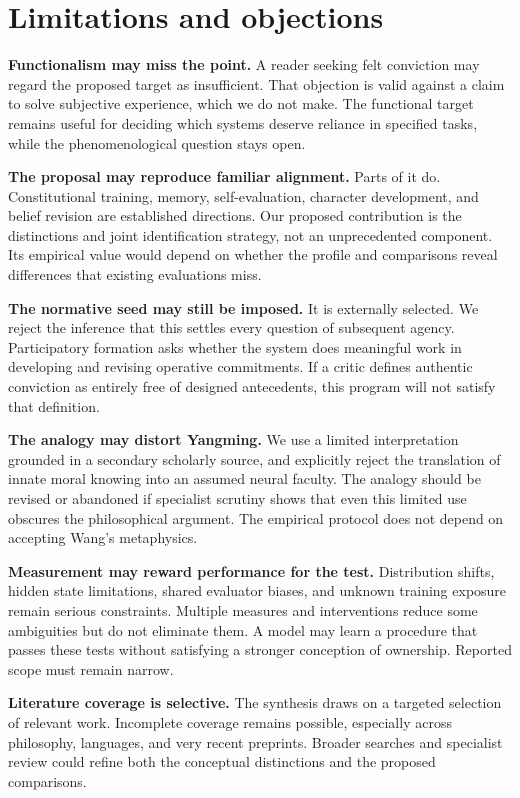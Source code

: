 \documentclass[11pt]{article}
\begin{document}
\section{Limitations and objections}

\textbf{Functionalism may miss the point.} A reader seeking felt conviction may regard the proposed target as insufficient. That objection is valid against a claim to solve subjective experience, which we do not make. The functional target remains useful for deciding which systems deserve reliance in specified tasks, while the phenomenological question stays open.

\textbf{The proposal may reproduce familiar alignment.} Parts of it do. Constitutional training, memory, self-evaluation, character development, and belief revision are established directions. Our proposed contribution is the distinctions and joint identification strategy, not an unprecedented component. Its empirical value would depend on whether the profile and comparisons reveal differences that existing evaluations miss.

\textbf{The normative seed may still be imposed.} It is externally selected. We reject the inference that this settles every question of subsequent agency. Participatory formation asks whether the system does meaningful work in developing and revising operative commitments. If a critic defines authentic conviction as entirely free of designed antecedents, this program will not satisfy that definition.

\textbf{The analogy may distort Yangming.} We use a limited interpretation grounded in a secondary scholarly source, and explicitly reject the translation of innate moral knowing into an assumed neural faculty. The analogy should be revised or abandoned if specialist scrutiny shows that even this limited use obscures the philosophical argument. The empirical protocol does not depend on accepting Wang's metaphysics.

\textbf{Measurement may reward performance for the test.} Distribution shifts, hidden state limitations, shared evaluator biases, and unknown training exposure remain serious constraints. Multiple measures and interventions reduce some ambiguities but do not eliminate them. A model may learn a procedure that passes these tests without satisfying a stronger conception of ownership. Reported scope must remain narrow.

\textbf{Literature coverage is selective.} The synthesis draws on a targeted selection of relevant work. Incomplete coverage remains possible, especially across philosophy, languages, and very recent preprints. Broader searches and specialist review could refine both the conceptual distinctions and the proposed comparisons.
\end{document}
